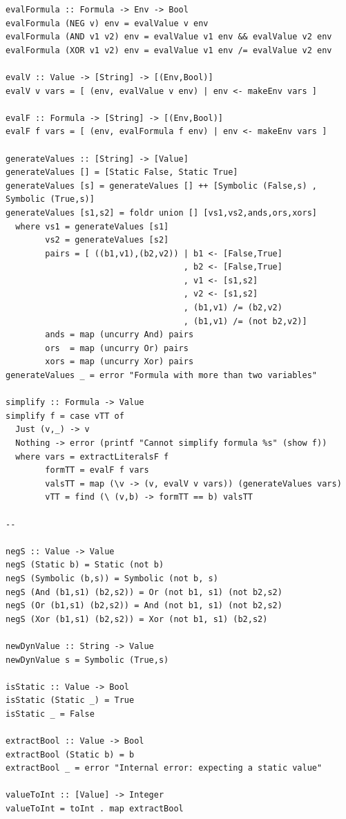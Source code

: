 \documentclass{article}
\begin{document}
\begin{verbatim}
evalFormula :: Formula -> Env -> Bool
evalFormula (NEG v) env = evalValue v env
evalFormula (AND v1 v2) env = evalValue v1 env && evalValue v2 env
evalFormula (XOR v1 v2) env = evalValue v1 env /= evalValue v2 env

evalV :: Value -> [String] -> [(Env,Bool)]
evalV v vars = [ (env, evalValue v env) | env <- makeEnv vars ]

evalF :: Formula -> [String] -> [(Env,Bool)]
evalF f vars = [ (env, evalFormula f env) | env <- makeEnv vars ]

generateValues :: [String] -> [Value]
generateValues [] = [Static False, Static True]
generateValues [s] = generateValues [] ++ [Symbolic (False,s) , Symbolic (True,s)] 
generateValues [s1,s2] = foldr union [] [vs1,vs2,ands,ors,xors]
  where vs1 = generateValues [s1]
        vs2 = generateValues [s2]
        pairs = [ ((b1,v1),(b2,v2)) | b1 <- [False,True]
                                    , b2 <- [False,True]
                                    , v1 <- [s1,s2]
                                    , v2 <- [s1,s2]
                                    , (b1,v1) /= (b2,v2)
                                    , (b1,v1) /= (not b2,v2)]
        ands = map (uncurry And) pairs
        ors  = map (uncurry Or) pairs
        xors = map (uncurry Xor) pairs
generateValues _ = error "Formula with more than two variables"

simplify :: Formula -> Value
simplify f = case vTT of
  Just (v,_) -> v
  Nothing -> error (printf "Cannot simplify formula %s" (show f))
  where vars = extractLiteralsF f
        formTT = evalF f vars
        valsTT = map (\v -> (v, evalV v vars)) (generateValues vars)
        vTT = find (\ (v,b) -> formTT == b) valsTT

--

negS :: Value -> Value 
negS (Static b) = Static (not b)
negS (Symbolic (b,s)) = Symbolic (not b, s)
negS (And (b1,s1) (b2,s2)) = Or (not b1, s1) (not b2,s2)
negS (Or (b1,s1) (b2,s2)) = And (not b1, s1) (not b2,s2)
negS (Xor (b1,s1) (b2,s2)) = Xor (not b1, s1) (b2,s2)

newDynValue :: String -> Value
newDynValue s = Symbolic (True,s)

isStatic :: Value -> Bool
isStatic (Static _) = True
isStatic _ = False

extractBool :: Value -> Bool
extractBool (Static b) = b
extractBool _ = error "Internal error: expecting a static value"

valueToInt :: [Value] -> Integer
valueToInt = toInt . map extractBool


\end{verbatim}
\end{document}
